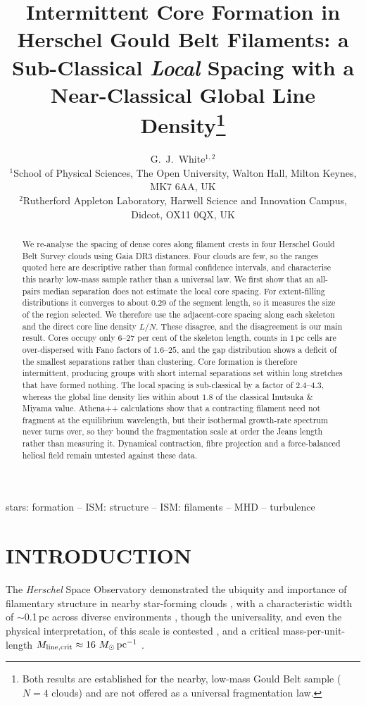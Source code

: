 \documentclass[usenatbib,twoside,twocolumn]{mnras}
\title[Intermittent core formation in HGBS filaments]{Intermittent Core Formation in Herschel Gould Belt Filaments: a Sub-Classical \emph{Local} Spacing with a Near-Classical Global Line Density\thanks{Both results are established for the nearby, low-mass Gould Belt sample ($N=4$ clouds) and are not offered as a universal fragmentation law.}}
\author[G.~J.~White]{G.~J.~White$^{1,2}$\\
$^{1}$School of Physical Sciences, The Open University, Walton Hall, Milton Keynes, MK7 6AA, UK\\
$^{2}$Rutherford Appleton Laboratory, Harwell Science and Innovation Campus, Didcot, OX11 0QX, UK}
\begin{document}
\maketitle

\begin{abstract}
We re-analyse the spacing of dense cores along filament crests in four Herschel Gould Belt Survey clouds using Gaia DR3 distances. Four clouds are few, so the ranges quoted here are descriptive rather than formal confidence intervals, and characterise this nearby low-mass sample rather than a universal law. We first show that an all-pairs median separation does not estimate the local core spacing. For extent-filling distributions it converges to about $0.29$ of the segment length, so it measures the size of the region selected. We therefore use the adjacent-core spacing along each skeleton and the direct core line density $L/N$. These disagree, and the disagreement is our main result. Cores occupy only $6$--$27$ per cent of the skeleton length, counts in $1$\,pc cells are over-dispersed with Fano factors of $1.6$--$25$, and the gap distribution shows a deficit of the smallest separations rather than clustering. Core formation is therefore intermittent, producing groups with short internal separations set within long stretches that have formed nothing. The local spacing is sub-classical by a factor of $2.4$--$4.3$, whereas the global line density lies within about $1.8$ of the classical Inutsuka \& Miyama value. Athena++ calculations show that a contracting filament need not fragment at the equilibrium wavelength, but their isothermal growth-rate spectrum never turns over, so they bound the fragmentation scale at order the Jeans length rather than measuring it. Dynamical contraction, fibre projection and a force-balanced helical field remain untested against these data.
\end{abstract}

\begin{keywords}
stars: formation -- ISM: structure -- ISM: filaments -- MHD -- turbulence
\end{keywords}

\section{INTRODUCTION}

The \textit{Herschel} Space Observatory demonstrated the ubiquity and importance of filamentary structure in nearby star-forming clouds \citep{Andre2010}, with a characteristic width of $\sim$0.1\,pc across diverse environments \citep{Arzoumanian2011}, though the universality, and even the physical interpretation, of this scale is contested \citep{Panopoulou2017,Panopoulou2022}, and a critical mass-per-unit-length $M_{\rm line,crit}\approx16~M_\odot\,{\rm pc^{-1}}$ \citep{Ostriker1964}.
\end{document}
